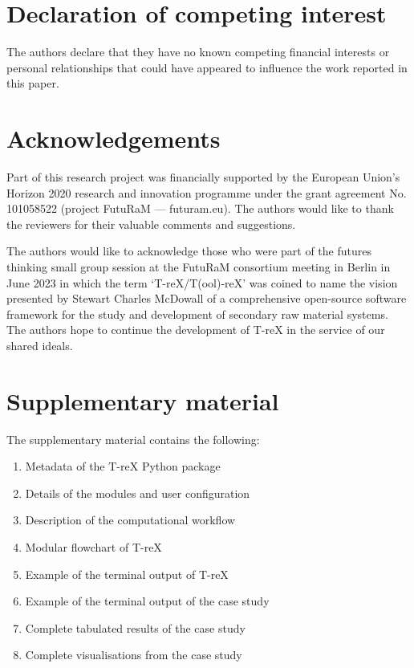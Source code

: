 \documentclass[review,3p,authoryear]{elsarticle}
\begin{document}
\section*{Declaration of competing interest}
The authors declare that they have no known competing financial interests or personal relationships that could have appeared to influence the work reported in this paper.

\section*{Acknowledgements}
Part of this research project was financially supported by the European Union's Horizon 2020 research and innovation programme under the grant agreement No. 101058522 (project FutuRaM --- futuram.eu). The authors would like to thank the reviewers for their valuable comments and suggestions.

The authors would like to acknowledge those who were part of the futures thinking small group session at the FutuRaM consortium meeting in Berlin in June 2023 in which the term `T-reX/T(ool)-reX' was coined to name the vision presented by Stewart Charles McDowall of a comprehensive open-source software framework for the study and development of secondary raw material systems. The authors hope to continue the development of T-reX in the service of our shared ideals.

\section*{Supplementary material}\label{sec:supplementary}
The supplementary material contains the following:
\begin{enumerate}
    \item Metadata of the T-reX Python package
    \item Details of the modules and user configuration
    \item Description of the computational workflow
    \item Modular flowchart of T-reX
    \item Example of the terminal output of T-reX
    \item Example of the terminal output of the case study
    \item Complete tabulated results of the case study
    \item Complete visualisations from the case study
\end{enumerate}






\end{document}
